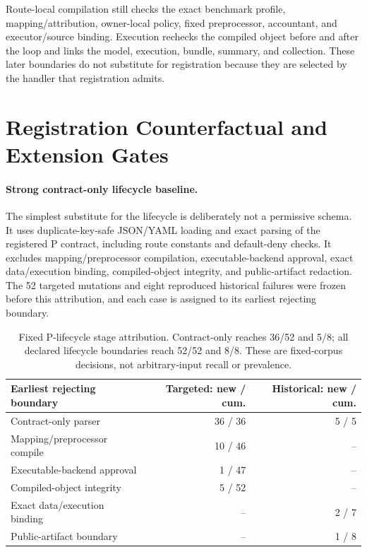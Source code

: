 \documentclass[letterpaper]{article}
\begin{document}
Route-local compilation still checks the exact benchmark profile,
mapping/attribution, owner-local policy, fixed preprocessor, accountant, and
executor/source binding.  Execution rechecks the compiled object before and
after the loop and links the model, execution, bundle, summary, and collection.
These later boundaries do not substitute for registration because they are
selected by the handler that registration admits.

\section{Registration Counterfactual and Extension Gates}
\label{sec:registration-gates}

\paragraph{Strong contract-only lifecycle baseline.}
The simplest substitute for the lifecycle is deliberately not a permissive
schema.  It uses duplicate-key-safe JSON/YAML loading and exact parsing of the
registered P contract, including route constants and default-deny checks.  It
excludes mapping/preprocessor compilation, executable-backend approval, exact
data/execution binding, compiled-object integrity, and public-artifact
redaction.  The 52 targeted mutations and eight reproduced historical failures
were frozen before this attribution, and each case is assigned to its earliest
rejecting boundary.

\begin{table}[t]
\centering
\footnotesize
\setlength{\tabcolsep}{4pt}
\begin{tabular}{@{}lrr@{}}
\toprule
Earliest rejecting boundary & Targeted: new / cum. & Historical: new / cum. \\
\midrule
Contract-only parser & 36 / 36 & 5 / 5 \\
Mapping/preprocessor compile & 10 / 46 & -- \\
Executable-backend approval & 1 / 47 & -- \\
Compiled-object integrity & 5 / 52 & -- \\
Exact data/execution binding & -- & 2 / 7 \\
Public-artifact boundary & -- & 1 / 8 \\
\bottomrule
\end{tabular}
\caption{Fixed P-lifecycle stage attribution.  Contract-only reaches 36/52
and 5/8; all declared lifecycle boundaries reach 52/52 and 8/8.  These are
fixed-corpus decisions, not arbitrary-input recall or prevalence.}
\label{tab:supp-contract-only}
\end{table}
\end{document}
